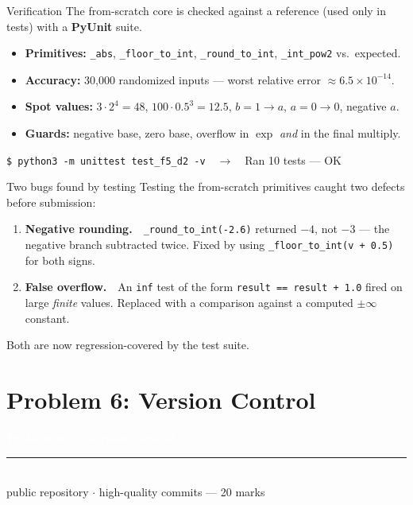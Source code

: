 \documentclass[10pt,aspectratio=169]{beamer}
\begin{document}
\begin{frame}{Verification}
  \small
  The from-scratch core is checked against a reference (used only in tests) with a \textbf{PyUnit} suite.
  \vspace{0.5em}
  \begin{itemize}\setlength\itemsep{0.25em}
    \item \textbf{Primitives:} \texttt{\_abs}, \texttt{\_floor\_to\_int}, \texttt{\_round\_to\_int}, \texttt{\_int\_pow2} vs.\ expected.
    \item \textbf{Accuracy:} 30{,}000 randomized inputs --- worst relative error $\approx 6.5\times10^{-14}$.
    \item \textbf{Spot values:} $3\cdot2^{4}{=}48$, $100\cdot0.5^{3}{=}12.5$, $b{=}1{\to}a$, $a{=}0{\to}0$, negative $a$.
    \item \textbf{Guards:} negative base, zero base, overflow in $\exp$ \emph{and} in the final multiply.
  \end{itemize}
  \vspace{0.4em}
  \footnotesize\texttt{\$ python3 -m unittest test\_f5\_d2 -v}\ \ $\rightarrow$\ \ \textcolor{green!50!black}{Ran 10 tests --- OK}
\end{frame}

\begin{frame}{Two bugs found by testing}
  \small
  Testing the from-scratch primitives caught two defects before submission:
  \vspace{0.5em}
  \begin{enumerate}\setlength\itemsep{0.5em}
    \item \textbf{Negative rounding.}\ \ \texttt{\_round\_to\_int(-2.6)} returned $-4$, not $-3$ --- the negative branch subtracted twice. Fixed by using \texttt{\_floor\_to\_int(v + 0.5)} for both signs.
    \item \textbf{False overflow.}\ \ An \texttt{inf} test of the form \texttt{result == result + 1.0} fired on large \emph{finite} values. Replaced with a comparison against a computed $\pm\infty$ constant.
  \end{enumerate}
  \vspace{0.3em}
  \footnotesize\textcolor{mLightTeal}{Both are now regression-covered by the test suite.}
\end{frame}

\section{Problem 6: Version Control}
{
\begin{frame}[plain]
  \vfill
  \begin{center}
    {\Large\bfseries\textcolor{white}{Problem 6 --- Version Control}}\\[0.5em]
    \textcolor{mAccent}{\rule{0.4\textwidth}{1.0pt}}\\[0.5em]
    {\normalsize\textcolor{white!85!black}{public repository $\cdot$ high-quality commits --- 20 marks}}
  \end{center}
  \vfill
\end{frame}}
\end{document}
